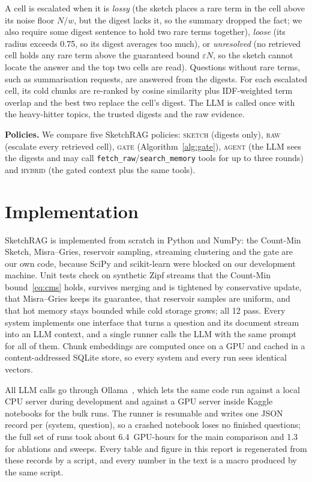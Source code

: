 \documentclass[conference,10pt]{IEEEtran}
\newcommand{\sys}[1]{\textsc{#1}}
\begin{document}
A cell is escalated when it is \emph{lossy} (the sketch places a rare term in the cell above its noise floor $N/w$, but
the digest lacks it, so the summary dropped the fact; we also require some digest sentence to hold two rare terms
together), \emph{loose} (its radius exceeds 0.75, so its digest averages too much), or \emph{unresolved} (no retrieved
cell holds any rare term above the guaranteed bound $\varepsilon N$, so the sketch cannot locate the answer and the top
two cells are read). Questions without rare terms, such as summarisation requests, are answered from the digests.
For each escalated cell, its cold chunks are re-ranked by cosine similarity plus IDF-weighted term overlap and the best
two replace the cell's digest. The LLM is called once with the heavy-hitter topics, the trusted digests and the raw
evidence.

\textbf{Policies.} We compare five SketchRAG policies: \sys{sketch} (digests only), \sys{raw} (escalate every retrieved
cell), \sys{gate} (Algorithm~\ref{alg:gate}), \sys{agent} (the LLM sees the digests and may call
\texttt{fetch\_raw}/\texttt{search\_memory} tools for up to three rounds) and \sys{hybrid} (the gated context plus the
same tools).

\section{Implementation}
SketchRAG is implemented from scratch in Python and NumPy: the Count-Min Sketch, Misra--Gries, reservoir sampling,
streaming clustering and the gate are our own code, because SciPy and scikit-learn were blocked on our development
machine. Unit tests check on synthetic Zipf streams that the Count-Min bound~\eqref{eq:cms} holds, survives merging and is
tightened by conservative update, that Misra--Gries keeps its guarantee, that reservoir samples are uniform, and that
hot memory stays bounded while cold storage grows; all 12 pass. Every
system implements one interface that turns a question and its document stream into an LLM context, and a single runner
calls the LLM with the same prompt for all of them. Chunk embeddings are computed once on a GPU and cached in a
content-addressed SQLite store, so every system and every run sees identical vectors.

All LLM calls go through Ollama~\cite{ollama}, which lets the same code run against a local CPU server during
development and against a GPU server inside Kaggle notebooks for the bulk runs. The runner is resumable and writes one
JSON record per (system, question), so a crashed notebook loses no finished questions; the full set of runs took about
6.4~GPU-hours for the main comparison and 1.3 for ablations and sweeps. Every table and figure in this report is
regenerated from these records by a script, and every number in the text is a macro produced by the same script.
\end{document}

